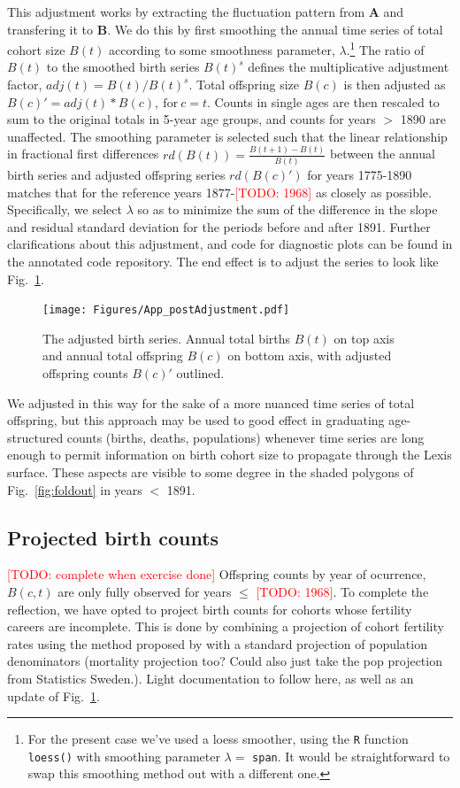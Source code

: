 \documentclass{article}
\renewcommand{\todo}[1]{\textcolor{red}{[TODO: #1]}}
\begin{document}
\begin{appendix}
This adjustment works by extracting the fluctuation pattern from \textbf{A} and transfering it to \textbf{B}. We do this by first smoothing the annual time series of total cohort size $B(t)$ according to some smoothness parameter, $\lambda$.\footnote{For the present case we've used a loess smoother, using the \texttt{R} function \texttt{loess()} with smoothing parameter $\lambda =$ \texttt{span}. It would be straightforward to swap this smoothing method out with a different one.} The ratio of $B(t)$ to the smoothed birth series $B(t)^s$ defines the multiplicative adjustment factor, $adj(t) = B(t)/B(t)^s$. Total offspring size $B(c)$ is then adjusted as $B(c)' = adj(t)*B(c), \mathrm{~for~} c = t$. Counts in single ages are then rescaled to sum to the original totals in 5-year age groups, and counts for years $>$ 1890 are unaffected. The smoothing parameter is selected such that the linear relationship in fractional first differences $rd(B(t)) = \frac{B(t+1)-B(t)}{B(t)}$ between the annual birth series and adjusted offspring series $rd(B(c)')$ for years 1775-1890 matches that for the reference years 1877-\todo{1968} as closely as possible. Specifically, we select $\lambda$ so as to minimize the sum of the difference in the slope and residual standard deviation for the periods before and after 1891. Further clarifications about this adjustment, and code for diagnostic plots can be found in the annotated code repository. The end effect is to adjust the series to look like Fig.~\ref{fig:better}.

\begin{figure}[ht!]
\centering
 \texttt{[image: Figures/App\_postAdjustment.pdf]}
\caption{The adjusted birth series. Annual total births $B(t)$ on top axis and annual total offspring $B(c)$ on bottom axis, with adjusted offspring counts $B(c)'$ outlined.}
\label{fig:better}
\end{figure}
\end{appendix}

We adjusted in this way for the sake of a more nuanced time series of total offspring, but this approach may be used to good effect in graduating age-structured counts (births, deaths, populations) whenever time series are long enough to permit information on birth cohort size to propagate through the Lexis surface. These aspects are visible to some degree in the shaded polygons of Fig.~\ref{fig:foldout} in years $<$ 1891.

\subsection{Projected birth counts}
\todo{complete when exercise done}
Offspring counts by year of ocurrence, $B(c,t)$ are only fully observed for years $\le$ \todo{1968}. To complete the reflection, we have opted to project birth counts for cohorts whose fertility careers are incomplete. This is done by combining a projection of cohort fertility rates using the method proposed by \citet{de1985time} with a standard projection of population denominators (mortality projection too? Could also just take the pop projection from Statistics Sweden.). Light documentation to follow here, as well as an update of Fig.~\ref{fig:better}.


\singlespacing

   
\end{document}
